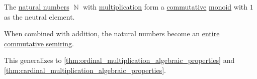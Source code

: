\begin{proposition}\label{thm:natural_number_multiplication_properties}
  The \hyperref[def:natural_numbers]{natural numbers} \( \BbbN \) with \hyperref[def:peano_arithmetic/mult]{multiplication} form a \hyperref[def:binary_operation/commutative]{commutative} \hyperref[def:monoid]{monoid} with \( 1 \) as the neutral element.

  When combined with addition, the natural numbers become an \hyperref[def:entire_semiring]{entire} \hyperref[def:semiring/commutative]{commutative semiring}.
\end{proposition}
\begin{comments}
  \item This generalizes to \cref{thm:ordinal_multiplication_algebraic_properties} and \cref{thm:cardinal_multiplication_algebraic_properties}.
\end{comments}
